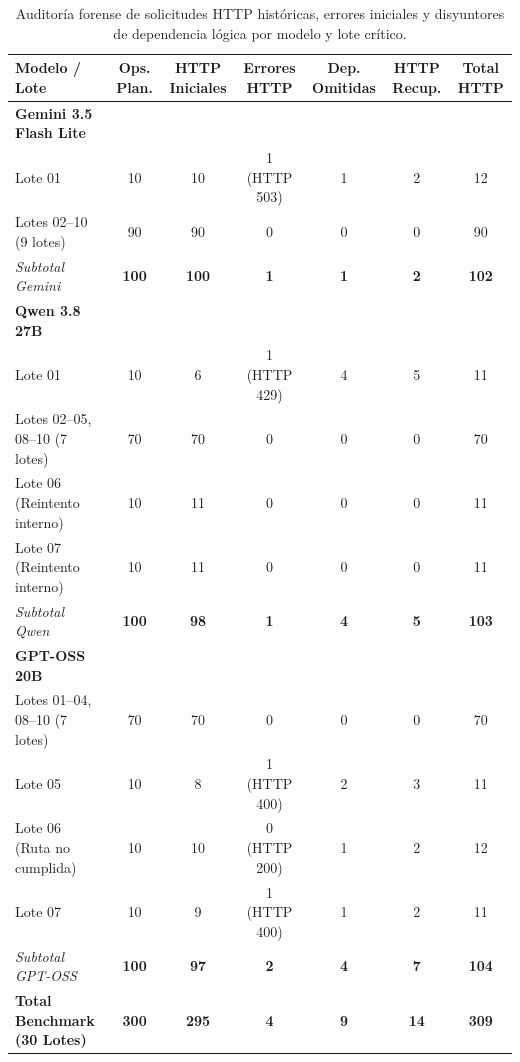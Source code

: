\documentclass{article}
\begin{document}
\begin{table}[t]
\centering
\caption{Auditoría forense de solicitudes HTTP históricas, errores iniciales y disyuntores de dependencia lógica por modelo y lote crítico.}
\label{tab:auditoria_http_incidentes}
\begin{tabular}{lcccccc}
\toprule
\textbf{Modelo / Lote} & \textbf{Ops. Plan.} & \textbf{HTTP Iniciales} & \textbf{Errores HTTP} & \textbf{Dep. Omitidas} & \textbf{HTTP Recup.} & \textbf{Total HTTP} \\
\midrule
\textbf{Gemini 3.5 Flash Lite} & & & & & & \\
\quad Lote 01 & 10 & 10 & 1 (HTTP 503) & 1 & 2 & 12 \\
\quad Lotes 02--10 (9 lotes) & 90 & 90 & 0 & 0 & 0 & 90 \\
\quad \textit{Subtotal Gemini} & \textbf{100} & \textbf{100} & \textbf{1} & \textbf{1} & \textbf{2} & \textbf{102} \\
\midrule
\textbf{Qwen 3.8 27B} & & & & & & \\
\quad Lote 01 & 10 & 6 & 1 (HTTP 429) & 4 & 5 & 11 \\
\quad Lotes 02--05, 08--10 (7 lotes) & 70 & 70 & 0 & 0 & 0 & 70 \\
\quad Lote 06 (Reintento interno) & 10 & 11 & 0 & 0 & 0 & 11 \\
\quad Lote 07 (Reintento interno) & 10 & 11 & 0 & 0 & 0 & 11 \\
\quad \textit{Subtotal Qwen} & \textbf{100} & \textbf{98} & \textbf{1} & \textbf{4} & \textbf{5} & \textbf{103} \\
\midrule
\textbf{GPT-OSS 20B} & & & & & & \\
\quad Lotes 01--04, 08--10 (7 lotes) & 70 & 70 & 0 & 0 & 0 & 70 \\
\quad Lote 05 & 10 & 8 & 1 (HTTP 400) & 2 & 3 & 11 \\
\quad Lote 06 (Ruta no cumplida) & 10 & 10 & 0 (HTTP 200) & 1 & 2 & 12 \\
\quad Lote 07 & 10 & 9 & 1 (HTTP 400) & 1 & 2 & 11 \\
\quad \textit{Subtotal GPT-OSS} & \textbf{100} & \textbf{97} & \textbf{2} & \textbf{4} & \textbf{7} & \textbf{104} \\
\midrule
\textbf{Total Benchmark (30 Lotes)} & \textbf{300} & \textbf{295} & \textbf{4} & \textbf{9} & \textbf{14} & \textbf{309} \\
\bottomrule
\end{tabular}
\end{table}
\end{document}
